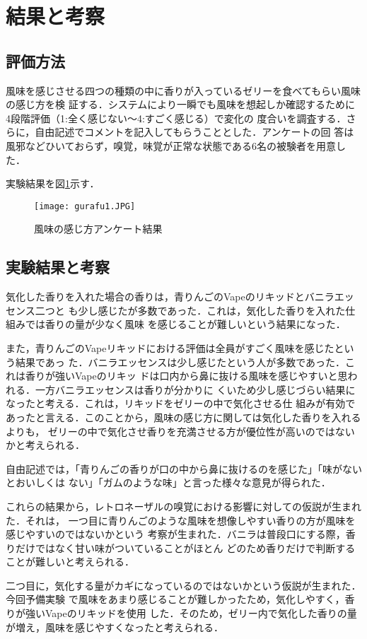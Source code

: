 \section{結果と考察}

\subsection{評価方法}

風味を感じさせる四つの種類の中に香りが入っているゼリーを食べてもらい風味の感じ方を検
証する．システムにより一瞬でも風味を想起しか確認するために
4段階評価（1:全く感じない～4:すごく感じる）で変化の
度合いを調査する．さらに，自由記述でコメントを記入してもらうこととした．アンケートの回
答は風邪などひいておらず，嗅覚，味覚が正常な状態である6名の被験者を用意した．

実験結果を図\ref{gurafu}示す．


\begin{figure}[t]
    \centering
    \texttt{[image: gurafu1.JPG]}
    \caption{風味の感じ方アンケート結果}
    \label{gurafu}
  \end{figure}


\subsection{実験結果と考察}

気化した香りを入れた場合の香りは，青りんごのVapeのリキッドとバニラエッセンス二つと
も少し感じたが多数であった．これは，気化した香りを入れた仕組みでは香りの量が少なく風味
を感じることが難しいという結果になった．


また，青りんごのVapeリキッドにおける評価は全員がすごく風味を感じたという結果であっ
た．バニラエッセンスは少し感じたという人が多数であった．これは香りが強いVapeのリキッ
ドは口内から鼻に抜ける風味を感じやすいと思われる．一方バニラエッセンスは香りが分かりに
くいため少し感じづらい結果になったと考える．これは，リキッドをゼリーの中で気化させる仕
組みが有効であったと言える．このことから，風味の感じ方に関しては気化した香りを入れるよりも，
ゼリーの中で気化させ香りを充満させる方が優位性が高いのではないかと考えられる．


自由記述では，「青りんごの香りが口の中から鼻に抜けるのを感じた」「味がないとおいしくは
ない」「ガムのような味」と言った様々な意見が得られた．


これらの結果から，レトロネーザルの嗅覚における影響に対しての仮説が生まれた．それは，
一つ目に青りんごのような風味を想像しやすい香りの方が風味を感じやすいのではないかという
考察が生まれた．バニラは普段口にする際，香りだけではなく甘い味がついていることがほとん
どのため香りだけで判断することが難しいと考えられる．


二つ目に，気化する量がカギになっているのではないかという仮説が生まれた．今回予備実験
で風味をあまり感じることが難しかったため，気化しやすく，香りが強いVapeのリキッドを使用
した．そのため，ゼリー内で気化した香りの量が増え，風味を感じやすくなったと考えられる．